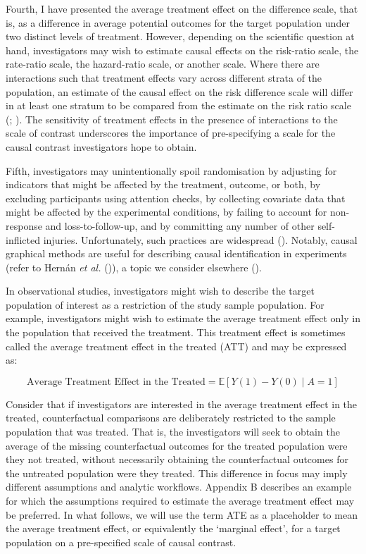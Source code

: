 \documentclass[
  single column]{article}
\begin{document}
Fourth, I have presented the average treatment effect on the difference
scale, that is, as a difference in average potential outcomes for the
target population under two distinct levels of treatment. However,
depending on the scientific question at hand, investigators may wish to
estimate causal effects on the risk-ratio scale, the rate-ratio scale,
the hazard-ratio scale, or another scale. Where there are interactions
such that treatment effects vary across different strata of the
population, an estimate of the causal effect on the risk difference
scale will differ in at least one stratum to be compared from the
estimate on the risk ratio scale
(;
). The sensitivity of
treatment effects in the presence of interactions to the scale of
contrast underscores the importance of pre-specifying a scale for the
causal contrast investigators hope to obtain.

Fifth, investigators may unintentionally spoil randomisation by
adjusting for indicators that might be affected by the treatment,
outcome, or both, by excluding participants using attention checks, by
collecting covariate data that might be affected by the experimental
conditions, by failing to account for non-response and
loss-to-follow-up, and by committing any number of other self-inflicted
injuries. Unfortunately, such practices are widespread
(). Notably,
causal graphical methods are useful for describing causal identification
in experiments (refer to Hernán \emph{et al.}
()), a topic we consider elsewhere
().

In observational studies, investigators might wish to describe the
target population of interest as a restriction of the study sample
population. For example, investigators might wish to estimate the
average treatment effect only in the population that received the
treatment. This treatment effect is sometimes called the average
treatment effect in the treated (ATT) and may be expressed as:

\[
\text{Average Treatment Effect in the Treated} = \mathbb{E}[Y(1) - Y(0) \mid A = 1]
\]

Consider that if investigators are interested in the average treatment
effect in the treated, counterfactual comparisons are deliberately
restricted to the sample population that was treated. That is, the
investigators will seek to obtain the average of the missing
counterfactual outcomes for the treated population were they not
treated, without necessarily obtaining the counterfactual outcomes for
the untreated population were they treated. This difference in focus may
imply different assumptions and analytic workflows. Appendix B describes
an example for which the assumptions required to estimate the average
treatment effect may be preferred. In what follows, we will use the term
ATE as a placeholder to mean the average treatment effect, or
equivalently the `marginal effect', for a target population on a
pre-specified scale of causal contrast.
\end{document}
